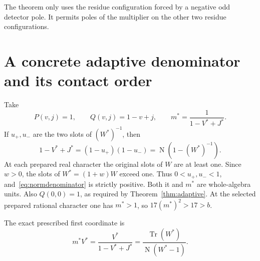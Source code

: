 \documentclass[11pt,a4paper]{article}
\theoremstyle{definition}\newtheorem{definition}[theorem]{Definition}
\DeclareMathOperator{\Tr}{Tr}\DeclareMathOperator{\Nm}{N}
\begin{document}
The theorem only uses the residue configuration forced by a negative
odd detector pole. It permits poles of the multiplier on the other
two residue configurations.

\section{A concrete adaptive denominator and its contact order}

Take
\begin{equation}\label{eq:concrete}
              P(v,j)=1,\qquad Q(v,j)=1-v+j,
              \qquad m^*=\frac{1}{1-V^*+J^*}.
\end{equation}
If $u_+,u_-$ are the two slots of $(W^*)^{-1}$, then
\begin{equation}\label{eq:normdenominator}
             1-V^*+J^*=(1-u_+)(1-u_-)
                         =\Nm(1-(W^*)^{-1}).
\end{equation}
At each prepared real character the original slots of $W$ are at
least one. Since $w>0$, the slots of $W^*=(1+w)W$ exceed one.
Thus $0<u_+,u_-<1$, and~\eqref{eq:normdenominator} is strictly
positive. Both it and $m^*$ are whole-algebra units. Also
$Q(0,0)=1$, as required by Theorem~\ref{thm:adaptive}. At the
selected prepared rational character one has $m^*>1$, so
$17(m^*)^2>17>b$.

The exact prescribed first coordinate is
\begin{equation}\label{eq:actualu}
             m^*V^*=\frac{V^*}{1-V^*+J^*}
                         =\frac{\Tr(W^*)}{\Nm(W^*-1)}.
\end{equation}
\end{document}
